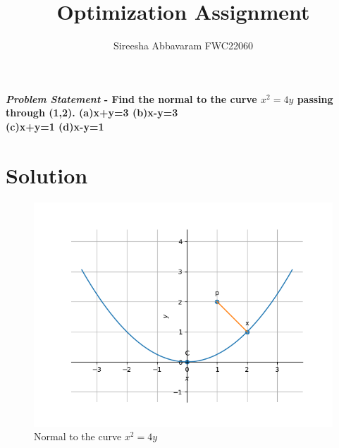 \documentclass[journal,10pt,twocolumn]{article}
\title{\textbf{Optimization Assignment}}
\author{Sireesha Abbavaram \hspace{9cm} FWC22060}
\begin{document}
\maketitle
\paragraph{\textit{Problem Statement} - 
\fi
Find the 
normal to the curve $x^2=4y$ passing through (1,2).
\iffalse
(a)x+y=3  \hspace{2cm} (b)x-y=3\\ 
(c)x+y=1 \hspace{2cm}  (d)x-y=1\\}

\section*{\large Solution}

\begin{figure}[H]
\centering
\includegraphics[width=1\columnwidth]{opt.png}
\caption{Normal to the curve $x^2=4y$}
\end{figure}
\end{document}
